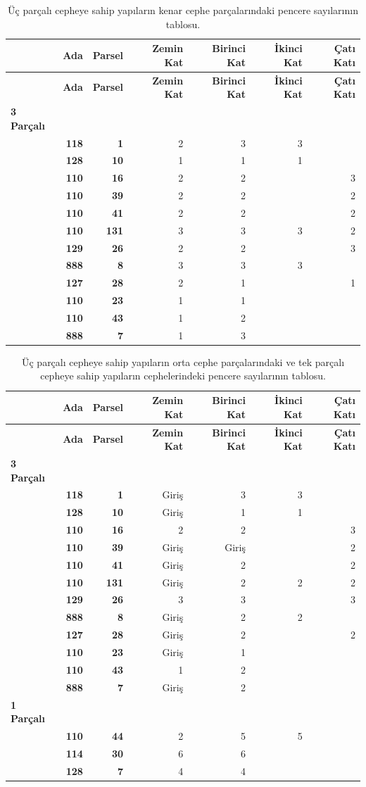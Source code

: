 \documentclass[12pt,turkish,a4paperpaper,]{report}
\begin{document}
\begin{longtable}[]{@{}lrrrrrr@{}}
\caption{Üç parçalı cepheye sahip yapıların kenar cephe parçalarındaki
pencere sayılarının tablosu. \label{PKenar}}\tabularnewline
\toprule
& \textbf{Ada} & \textbf{Parsel} & \textbf{Zemin Kat} & \textbf{Birinci
Kat} & \textbf{İkinci Kat} & \textbf{Çatı Katı}\tabularnewline
\midrule
\endfirsthead
\toprule
& \textbf{Ada} & \textbf{Parsel} & \textbf{Zemin Kat} & \textbf{Birinci
Kat} & \textbf{İkinci Kat} & \textbf{Çatı Katı}\tabularnewline
\midrule
\endhead
\textbf{3 Parçalı} & & & & & &\tabularnewline
& \textbf{118} & \textbf{1} & 2 & 3 & 3 &\tabularnewline
& \textbf{128} & \textbf{10} & 1 & 1 & 1 &\tabularnewline
& \textbf{110} & \textbf{16} & 2 & 2 & & 3\tabularnewline
& \textbf{110} & \textbf{39} & 2 & 2 & & 2\tabularnewline
& \textbf{110} & \textbf{41} & 2 & 2 & & 2\tabularnewline
& \textbf{110} & \textbf{131} & 3 & 3 & 3 & 2\tabularnewline
& \textbf{129} & \textbf{26} & 2 & 2 & & 3\tabularnewline
& \textbf{888} & \textbf{8} & 3 & 3 & 3 &\tabularnewline
& \textbf{127} & \textbf{28} & 2 & 1 & & 1\tabularnewline
& \textbf{110} & \textbf{23} & 1 & 1 & &\tabularnewline
& \textbf{110} & \textbf{43} & 1 & 2 & &\tabularnewline
& \textbf{888} & \textbf{7} & 1 & 3 & &\tabularnewline
\bottomrule
\end{longtable}

\begin{longtable}[]{@{}lrrrrrr@{}}
\caption{Üç parçalı cepheye sahip yapıların orta cephe parçalarındaki ve
tek parçalı cepheye sahip yapıların cephelerindeki pencere sayılarının
tablosu. \label{POrta}}\tabularnewline
\toprule
& \textbf{Ada} & \textbf{Parsel} & \textbf{Zemin Kat} & \textbf{Birinci
Kat} & \textbf{İkinci Kat} & \textbf{Çatı Katı}\tabularnewline
\midrule
\endfirsthead
\toprule
& \textbf{Ada} & \textbf{Parsel} & \textbf{Zemin Kat} & \textbf{Birinci
Kat} & \textbf{İkinci Kat} & \textbf{Çatı Katı}\tabularnewline
\midrule
\endhead
\textbf{3 Parçalı} & & & & & &\tabularnewline
& \textbf{118} & \textbf{1} & Giriş & 3 & 3 &\tabularnewline
& \textbf{128} & \textbf{10} & Giriş & 1 & 1 &\tabularnewline
& \textbf{110} & \textbf{16} & 2 & 2 & & 3\tabularnewline
& \textbf{110} & \textbf{39} & Giriş & Giriş & & 2\tabularnewline
& \textbf{110} & \textbf{41} & Giriş & 2 & & 2\tabularnewline
& \textbf{110} & \textbf{131} & Giriş & 2 & 2 & 2\tabularnewline
& \textbf{129} & \textbf{26} & 3 & 3 & & 3\tabularnewline
& \textbf{888} & \textbf{8} & Giriş & 2 & 2 &\tabularnewline
& \textbf{127} & \textbf{28} & Giriş & 2 & & 2\tabularnewline
& \textbf{110} & \textbf{23} & Giriş & 1 & &\tabularnewline
& \textbf{110} & \textbf{43} & 1 & 2 & &\tabularnewline
& \textbf{888} & \textbf{7} & Giriş & 2 & &\tabularnewline
\textbf{1 Parçalı} & & & & & &\tabularnewline
& \textbf{110} & \textbf{44} & 2 & 5 & 5 &\tabularnewline
& \textbf{114} & \textbf{30} & 6 & 6 & &\tabularnewline
& \textbf{128} & \textbf{7} & 4 & 4 & &\tabularnewline
\bottomrule
\end{longtable}
\end{document}
